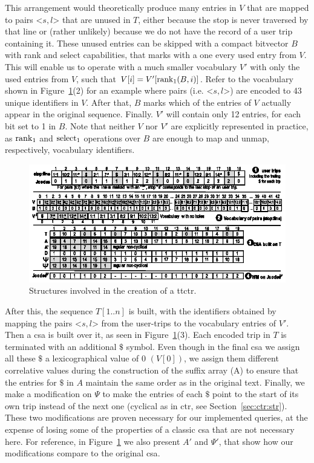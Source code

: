     This arrangement would theoretically produce many entries in $V$ that are mapped to pairs <$s,l$> that are unused in $T$, either because the stop is never traversed by that line or (rather unlikely) because we do not have the record of a user trip containing it. These unused entries can be skipped with a compact bitvector $B$ with rank and select capabilities, that marks with a one every used entry from $V$. This will enable us to operate with a much smaller vocabulary $V'$ with only the used entries from $V$, such that $V[i] = V'[\operatorname{rank}_1(B,i)]$. Refer to the vocabulary shown in Figure~\ref{fig:ttctr}(2) for an example where pairs (i.e. <$s,l$>) are encoded to 43 unique identifiers in $V$. After that, $B$ marks which of the entries of $V$ actually appear in the original sequence. Finally. $V'$ will contain only 12 entries, for each bit set to 1 in $B$. Note that neither $V$ nor $V'$ are explicitly represented in practice, as $\operatorname{rank}_1$ and $\operatorname{select}_1$ operations over $B$ are enough to map and unmap, respectively, vocabulary identifiers.

    \begin{figure}[ht]
        \includegraphics[width=1.00\textwidth]{figures/ttctr2019.eps}
    	\caption{Structures involved in the creation of a \acrshort{ttctr}.}
    	\label{fig:ttctr}
    \end{figure}
    
    After this, the sequence $T[1..n]$ is built, with the identifiers obtained by mapping the pairs <$s,l$> from the user-trips to the vocabulary entries of $V'$. Then a \gls{csa} is built over it, as seen in Figure~\ref{fig:ttctr}(3). Each encoded trip in $T$ is terminated with an additional $\$$ symbol. Even though in the final \gls{csa} we assign all these $\$$ a lexicographical value of 0 $(V[0])$, we assign them different correlative values during the construction of the suffix array (A) to ensure that the entries for $\$$ in $A$ maintain the same order as in the original text. Finally, we make a modification on $\Psi$ to make the entries of each $\$$ point to the start of its own trip instead of the next one (cyclical as in \gls{ctr}, see Section~\ref{sec:ctr:str}). These two modifications are proven necessary for our implemented queries, at the expense of losing some of the properties of a classic \gls{csa} that are not necessary here. For reference, in Figure~\ref{fig:ttctr} we also present $A'$ and $\Psi'$, that show how our modifications compare to the original \gls{csa}.

